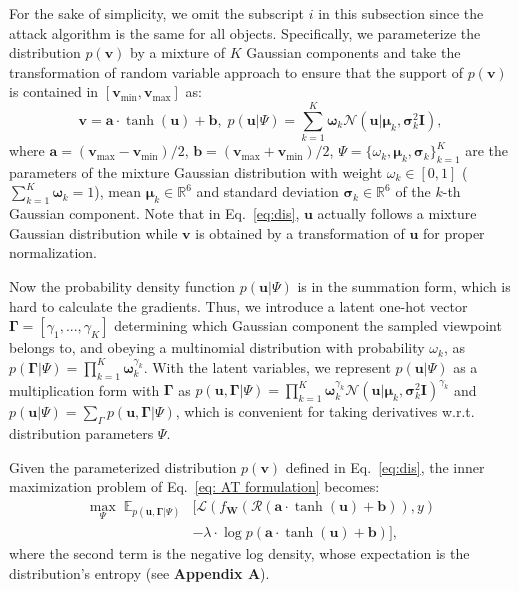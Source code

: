 \documentclass[10pt,journal,compsoc]{IEEEtran}
\begin{document}
For the sake of simplicity, we omit the subscript $i$ in this subsection since the attack algorithm is the same for all objects. Specifically, we parameterize the distribution $p(\mathbf{v})$ by a mixture of $K$ Gaussian components and take the transformation of random variable approach to ensure that the support of $p(\mathbf{v})$ is contained in $[\mathbf{v}_{\min},\mathbf{v}_{\max}]$ as:
\begin{equation}\label{eq:dis}
 \mathbf{v} = \mathbf{a}\cdot \tanh(\mathbf{u})+\mathbf{b}, \; p(\mathbf{u}|\Psi) = \sum_{k=1}^{K} \mathbf{\omega}_k\mathcal{N} (\mathbf{u}|\boldsymbol{\mu}_k,\boldsymbol{\sigma}^2_k\mathbf{I}),   
\end{equation}
where $\mathbf{a}  = (\mathbf{v}_{\max}-\mathbf{v}_{\min})/2$, $\mathbf{b}  = (\mathbf{v}_{\max}+\mathbf{v}_{\min})/2$, $\Psi=\{\omega_k, \boldsymbol{\mu}_k, \boldsymbol{\sigma}_k\}^K_{k=1}$ are the parameters of the mixture Gaussian distribution with weight $\omega_k\in [0,1]$ ($\sum_{k=1}^K\mathbf{\omega }_k=1$), mean $\boldsymbol{\mu}_k\in \mathbb{R} ^{6}$ and standard deviation $\boldsymbol{\sigma }_k\in \mathbb{R} ^{6}$ of the $k$-th Gaussian component. Note that in Eq.~\eqref{eq:dis}, $\mathbf{u}$ actually follows a mixture Gaussian distribution while $\mathbf{v}$ is obtained by a transformation of $\mathbf{u}$ for proper normalization.  

Now the probability density function $p(\mathbf{u}|\Psi)$ is in the summation form, which is hard to calculate the gradients. Thus, we introduce a latent one-hot vector $\boldsymbol{\Gamma}=[\gamma_1, ..., \gamma_K]$ determining which Gaussian component the sampled viewpoint belongs to, and obeying a multinomial distribution with probability $\omega_k$, as $p(\boldsymbol{\Gamma}|\Psi)=\prod_{k=1}^{K} \mathbf{\omega}_k^{\gamma_k}$. 
With the latent variables, we represent  $p(\mathbf{u}|\Psi)$ as a multiplication form with $\boldsymbol{\Gamma}$ as $p(\mathbf{u},\boldsymbol{\Gamma}|\Psi) = \prod_{k=1}^{K} \mathbf{\omega}_k^{\gamma_k}\mathcal{N}(\mathbf{u}|\boldsymbol{\mu}_k,\boldsymbol{\sigma}^2_k\mathbf{I})^{\gamma_k}$
and $p(\mathbf{u}|\Psi)=\sum_{\Gamma}p(\mathbf{u},\boldsymbol{\Gamma}|\Psi)$, which is convenient for taking derivatives w.r.t. distribution parameters $\Psi$. 

Given the parameterized distribution $p(\mathbf{v})$ defined in Eq.~\eqref{eq:dis}, the inner maximization problem of  Eq.~\eqref{eq: AT formulation} becomes:
\begin{equation}
    \begin{split}
        \max_{\Psi}\; \mathbb{E}_{ p(\mathbf{u},\boldsymbol{\Gamma}|\Psi)} & \big[ \mathcal{L}(f_\mathbf{W}  (\mathcal{R}(\mathbf{a}\cdot \tanh(\mathbf{u})+\mathbf{b}) ) ,y) \\
        & - \lambda\cdot \log p(\mathbf{a}\cdot \tanh(\mathbf{u})+\mathbf{b})\big],
    \end{split}
    \label{eq: attack2}
\end{equation}
where the second term is the negative log density, whose expectation is the distribution's entropy (see \textbf{Appendix A}). 
\end{document}
